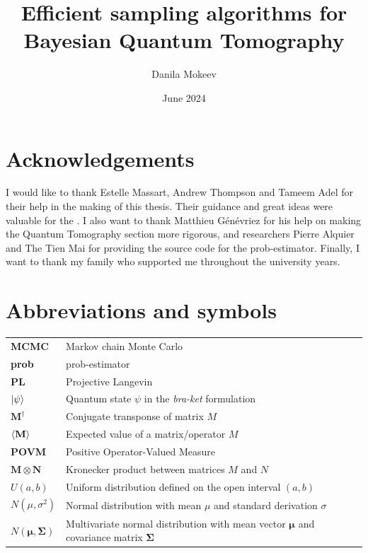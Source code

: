\documentclass[12pt]{memoir}
\title{Efficient sampling algorithms for Bayesian Quantum Tomography}
\author{Danila Mokeev}
\date{June 2024}
\newcommand{\mb}{\mathbf}
\newcommand{\tb}{\textbf}
\newcommand{\ti}{\textit}
\begin{document}

\maketitle


\newpage

\chapter*{Acknowledgements}
I would like to thank Estelle Massart, Andrew Thompson and Tameem Adel for their help in the making of this thesis. Their guidance and great ideas were valuable for the . I also want to thank Matthieu Génévriez for his help on making the Quantum Tomography section more rigorous, and researchers Pierre Alquier and The Tien Mai for providing the source code for the prob-estimator. Finally, I want to thank my family who supported me throughout the university years.
\newpage

\tableofcontents*

\newpage

\chapter*{Abbreviations and symbols}
\begin{tabular}{ll}
\tb{MCMC} & Markov chain Monte Carlo\\
\tb{prob} & prob-estimator\\
\tb{PL}& Projective Langevin  \\
$\ket{{\psi}}$ & Quantum state $\psi$ in the \ti{bra-ket} formulation\\
$\mb{M^\dagger}$ & Conjugate transponse of matrix $M$\\
$\braket{\mb M}$ & Expected value of a matrix/operator $M$\\
\tb {POVM} & Positive Operator-Valued Measure\\
$\mb{M\otimes N}$ & Kronecker product between matrices $M$ and $N$\\
${U}(a,b)$ & Uniform distribution defined on the open interval $(a,b)$\\
$N(\mu, \sigma^2)$ & Normal distribution with mean $\mu$ and standard derivation $\sigma$\\
$N(\boldsymbol{\mu},\boldsymbol{\Sigma})$ & Multivariate normal distribution with mean vector $\boldsymbol{\mu}$ and covariance matrix $\boldsymbol{\Sigma}$ 
\end{tabular}
\end{document}
